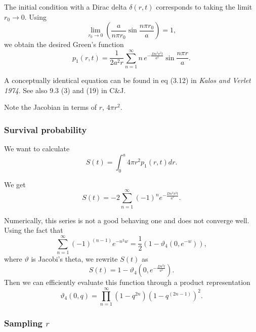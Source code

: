 \documentclass[english]{article}
\begin{document}
The initial condition with a Dirac delta $\delta(r,t)$ corresponds to
taking the limit $r_{0}\rightarrow0$. Using 
\begin{equation}
  \lim_{r_{0}\rightarrow0}\left(\frac{a}{n\pi r_{0}}\sin\frac{n\pi
      r_{0}}{a}\right)=1,
\end{equation}
 we obtain the desired Green's function 
 \begin{equation}
   p_{1}(r,t)=\frac{1}{2a^{2}r}\sum_{n=1}^{\infty}n\, e^{-\frac{Dn^{2}\pi^{2}t}{a^{2}}}\sin\frac{n\pi r}{a}.
 \end{equation}


A conceptually identical equation can be found in eq (3.12) in \textit{Kalos
and Verlet 1974}. See also 9.3 (3) and (19) in C\&J.

Note the Jacobian in terms of $r$, $4\pi r^{2}$.


\subsubsection{Survival probability}

We want to calculate \begin{equation}
S(t)=\int_{0}^{a}4\pi r^{2}p_{1}(r,t)dr.\end{equation}


We get \begin{equation}
S(t)=-2\sum_{n=1}^{\infty}(-1)^{n}e^{-\frac{Dn^{2}\pi^{2}t}{a^{2}}}.\end{equation}


Numerically, this series is not a good behaving one and does not converge
well. Using the fact that \begin{equation}
\sum_{n=1}^{\infty}(-1)^{(n-1)}e^{-n^{2}w}=\frac{1}{2}(1-\vartheta_{4}(0,e^{-w})),\end{equation}
 where $\vartheta$ is Jacobi's theta, we rewrite $S(t)$ as \begin{equation}
S(t)=1-\vartheta_{4}(0,e^{-\frac{D\pi^{2}t}{a^{2}}}).\end{equation}
 Then we can efficiently evaluate this function through a product
representation \begin{equation}
\vartheta_{4}(0,q)=\prod_{n=1}^{\infty}(1-q^{2n})(1-q^{(2n-1)})^{2}.\end{equation}



\subsubsection{Sampling $r$}
\end{document}
